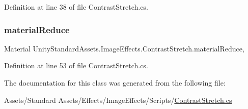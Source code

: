 Definition at line 38 of file Contrast\+Stretch.\+cs.

\mbox{\label{class_unity_standard_assets_1_1_image_effects_1_1_contrast_stretch_a6772c7ae3b47015455e246e219b32003}} 
\subsubsection{\texorpdfstring{material\+Reduce}{materialReduce}}
{\footnotesize\ttfamily Material Unity\+Standard\+Assets.\+Image\+Effects.\+Contrast\+Stretch.\+material\+Reduce\hspace{0.3cm}{\ttfamily [get]}, {\ttfamily [protected]}}



Definition at line 53 of file Contrast\+Stretch.\+cs.



The documentation for this class was generated from the following file\+:\begin{DoxyCompactItemize}
\item 
Assets/\+Standard Assets/\+Effects/\+Image\+Effects/\+Scripts/\mbox{\hyperlink{_contrast_stretch_8cs}{Contrast\+Stretch.\+cs}}\end{DoxyCompactItemize}
